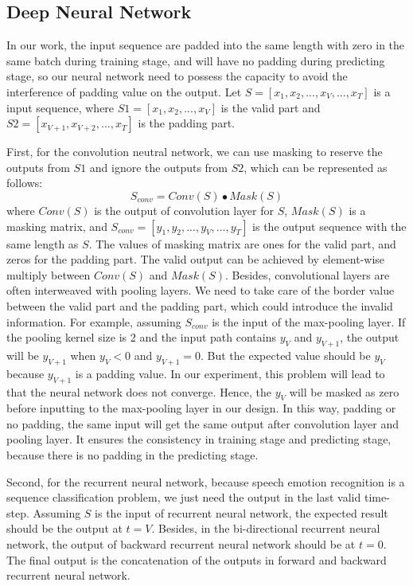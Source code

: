 \documentclass[a4paper]{article}
\begin{document}
\subsection{Deep Neural Network}
\label{ssec:deep_neural_network}

In our work, the input sequence are padded into the same length with zero in the same batch during training stage, and will have no padding during predicting stage, so our neural network need to possess the capacity to avoid the interference of padding value on the output.  Let $S=[x_1, x_2, ..., x_V, ..., x_T]$ is a input sequence, where $S1=[x_1, x_2, ..., x_V]$ is the valid part and $S2=[x_{V+1}, x_{V+2}, ..., x_T]$ is the padding part.

First, for the convolution neutral network, we can use masking to reserve the outputs from $S1$ and ignore the outputs from $S2$, which can be represented as follows:
\begin{equation}
\label{eq:masking}
S_{conv}=Conv(S) \bullet Mask(S)
\end{equation}
where $Conv(S)$ is the output of convolution layer for $S$, $Mask(S)$ is a masking matrix, and $S_{conv}=[y_1, y_2, ..., y_V, ..., y_T]$ is the output sequence with the same length as $S$. The values of masking matrix are ones for the valid part, and zeros for the padding part. The valid output can be achieved by element-wise multiply between $Conv(S)$ and $Mask(S)$. Besides, convolutional layers are often interweaved with pooling layers. We need to take care of the border value between the valid part and the padding part, which could introduce the invalid information. For example, assuming $S_{conv}$ is the input of the max-pooling layer. If the pooling kernel size is 2 and the input path contains $y_V$ and $y_{V+1}$, the output will be $y_{V+1}$ when $y_V<0$ and $y_{V+1}=0$. But the expected value should be $y_V$ because $y_{V+1}$ is a padding value. In our experiment, this problem will lead to that the neural network does not converge. Hence, the $y_V$ will be masked as zero before inputting to the max-pooling layer in our design. In this way, padding or no padding, the same input will get the same output after convolution layer and pooling layer. It ensures the consistency in training stage and predicting stage, because there is no padding in the predicting stage.

Second, for the recurrent neural network, because speech emotion recognition is a sequence classification problem, we just need the output in the last valid time-step. Assuming $S$ is the input of recurrent neural network, the expected result should be the output at $t=V$. Besides, in the bi-directional recurrent neural network, the output of backward recurrent neural network should be at $t=0$. The final output is the concatenation of the outputs in forward and backward recurrent neural network.
\end{document}

